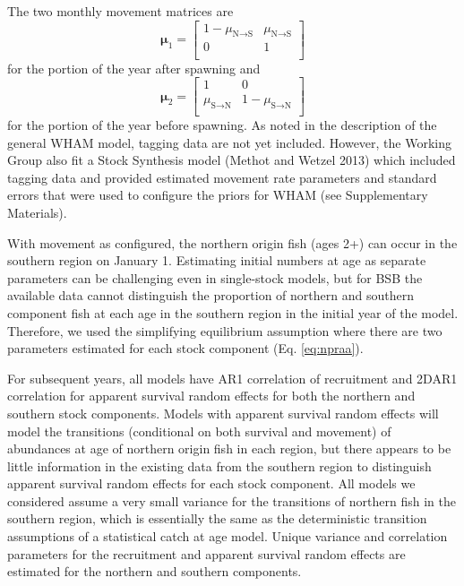 \documentclass[
]{article}
\begin{document}
The two monthly movement matrices are
\begin{equation*}
\boldsymbol{\mu}_{1} = 
  \begin{bmatrix}
     1-\mu_{\text{N}\rightarrow \text{S}} & \mu_{\text{N}\rightarrow \text{S}} \\
     0 & 1 \\
  \end{bmatrix}
\end{equation*}
for the portion of the year after spawning and
\begin{equation*}
\boldsymbol{\mu}_{2} = 
  \begin{bmatrix}
     1 &  0 \\
     \mu_{\text{S}\rightarrow \text{N}} & 1-\mu_{\text{S}\rightarrow \text{N}} \\
  \end{bmatrix}
\end{equation*}
for the portion of the year before spawning. As noted in the description of the general WHAM model, tagging data are not yet included. However, the Working Group also fit a Stock Synthesis model (Methot and Wetzel 2013) which included tagging data and provided estimated movement rate parameters and standard errors that were used to configure the priors for WHAM (see Supplementary Materials).

With movement as configured, the northern origin fish (ages 2+) can occur in the southern region on January 1. Estimating initial numbers at age as separate parameters can be challenging even in single-stock models, but for BSB the available data cannot distinguish the proportion of northern and southern component fish at each age in the southern region in the initial year of the model. Therefore, we used the simplifying equilibrium assumption where there are two parameters estimated for each stock component (Eq. \ref{eq:npraa}).

For subsequent years, all models have AR1 correlation of recruitment and 2DAR1 correlation for apparent survival random effects for both the northern and southern stock components. Models with apparent survival random effects will model the transitions (conditional on both survival and movement) of abundances at age of northern origin fish in each region, but there appears to be little information in the existing data from the southern region to distinguish apparent survival random effects for each stock component. All models we considered assume a very small variance for the transitions of northern fish in the southern region, which is essentially the same as the deterministic transition assumptions of a statistical catch at age model. Unique variance and correlation parameters for the recruitment and apparent survival random effects are estimated for the northern and southern components.
\end{document}
